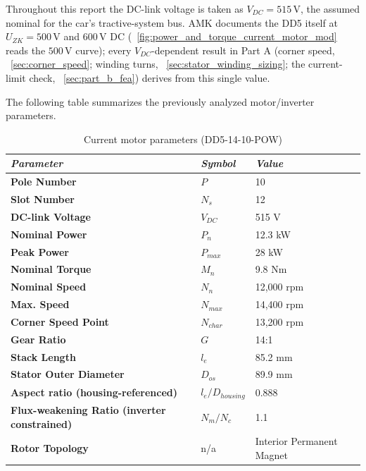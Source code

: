 \documentclass[10pt,final,journal,a4paper,oneside,twocolumn]{IEEEtran}
\begin{document}
Throughout this report the DC-link voltage is taken as $V_{DC}=515\,\text{V}$, the assumed nominal for the car's tractive-system bus. AMK documents the DD5 itself at $U_{ZK}=500\,\text{V}$ and $600\,\text{V}$ DC (\figurename~\ref{fig:power_and_torque_current_motor_mod} reads the $500\,\text{V}$ curve); every $V_{DC}$-dependent result in Part A (corner speed, \sectionname~\ref{sec:corner_speed}; winding turns, \sectionname~\ref{sec:stator_winding_sizing}; the current-limit check, \sectionname~\ref{sec:part_b_fea}) derives from this single value.

The following table summarizes the previously analyzed motor/inverter parameters.

\begin{table}[!t]
\centering
\caption{Current motor parameters (DD5-14-10-POW)}
\label{tab:current_motor_data}
\begin{tabular}{@{}L{0.44\columnwidth} L{0.19\columnwidth} L{0.26\columnwidth}@{}}
\hline
\textit{Parameter} & \textit{Symbol} & \textit{Value}\\ \hline
\textbf{Pole Number} & $P$ & 10 \\
\textbf{Slot Number} & $N_s$ & 12 \\
\textbf{DC-link Voltage} & $V_{DC}$ & 515 V\\
\textbf{Nominal Power} & $P_{n}$ & 12.3 kW \\
\textbf{Peak Power} & $P_{max}$ & 28 kW \\
\textbf{Nominal Torque} & $M_{n}$ & 9.8 Nm \\
\textbf{Nominal Speed} & $N_{n}$ & 12,000 rpm \\
\textbf{Max. Speed} & $N_{max}$ & 14,400 rpm \\
\textbf{Corner Speed Point} & $N_{char}$ & 13,200 rpm \\
\textbf{Gear Ratio} & $G$ & 14:1 \\
\textbf{Stack Length} & $l_e$ & 85.2 mm \\
\textbf{Stator Outer Diameter} & $D_{os}$ & 89.9 mm \\
\textbf{Aspect ratio (housing-referenced)} & $l_e/D_{housing}$ & 0.888 \\ %
\textbf{Flux-weakening Ratio (inverter constrained)} & $N_m/N_c$ & 1.1 \\
\textbf{Rotor Topology} & n/a & Interior Permanent Magnet \\ \hline
\end{tabular}
\end{table}
\end{document}
